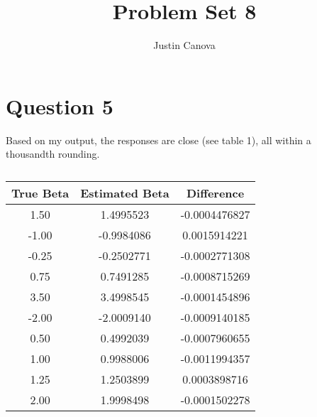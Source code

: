 \documentclass{article}
\title{Problem Set 8}
\author{Justin Canova}
\begin{document}
\maketitle


\section{Question 5}

Based on my output, the responses are close (see table 1), all within a thousandth rounding.
\begin{table}
    \centering
    \begin{tabular}{c|c|c}
    True Beta & Estimated Beta & Difference \\\hline
         1.50   &   1.4995523 & -0.0004476827\\
         -1.00  &   -0.9984086 & 0.0015914221\\
         -0.25  &  -0.2502771 & -0.0002771308\\
         0.75   &   0.7491285 & -0.0008715269\\
         3.50   &   3.4998545 & -0.0001454896\\
         -2.00  &   -2.0009140 & -0.0009140185\\
         0.50   &   0.4992039 & -0.0007960655\\
         1.00   &   0.9988006 & -0.0011994357\\
         1.25   &   1.2503899 &  0.0003898716\\
         2.00   &   1.9998498 & -0.0001502278\\
    \end{tabular}
    \caption{}
    \label{tab:my_label}
\end{table}
\end{document}
